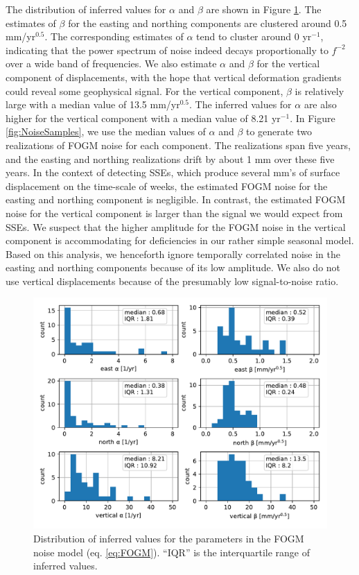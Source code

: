 \documentclass[extra,mreferee]{gji}
\begin{document}
The distribution of inferred values for $\alpha$ and $\beta$ are shown
in Figure \ref{fig:NoiseParams}. The estimates of $\beta$ for the
easting and northing components are clustered around 0.5
mm/yr$^{0.5}$. The corresponding estimates of $\alpha$ tend to cluster
around 0 yr$^{-1}$, indicating that the power spectrum of noise indeed
decays proportionally to $f^{-2}$ over a wide band of frequencies. We
also estimate $\alpha$ and $\beta$ for the vertical component of
displacements, with the hope that vertical deformation gradients could
reveal some geophysical signal. For the vertical component, $\beta$ is
relatively large with a median value of 13.5 mm/yr$^{0.5}$. The
inferred values for $\alpha$ are also higher for the vertical
component with a median value of 8.21 yr$^{-1}$. In Figure
\ref{fig:NoiseSamples}, we use the median values of $\alpha$ and
$\beta$ to generate two realizations of FOGM noise for each component.
The realizations span five years, and the easting and northing
realizations drift by about 1 mm over these five years. In the context
of detecting SSEs, which produce several mm's of surface displacement
on the time-scale of weeks, the estimated FOGM noise for the easting
and northing component is negligible. In contrast, the estimated FOGM
noise for the vertical component is larger than the signal we would
expect from SSEs. We suspect that the higher amplitude for the FOGM
noise in the vertical component is accommodating for deficiencies in
our rather simple seasonal model. Based on this analysis, we
henceforth ignore temporally correlated noise in the easting and
northing components because of its low amplitude. We also do not use
vertical displacements because of the presumably low signal-to-noise
ratio.

\begin{figure}
\includegraphics{figures/noise/noise-params.pdf}
\caption{
Distribution of inferred values for the parameters in the FOGM noise
model (eq. \ref{eq:FOGM}). ``IQR'' is the interquartile range of
inferred values.
}   
\label{fig:NoiseParams}
\end{figure}
\end{document}
